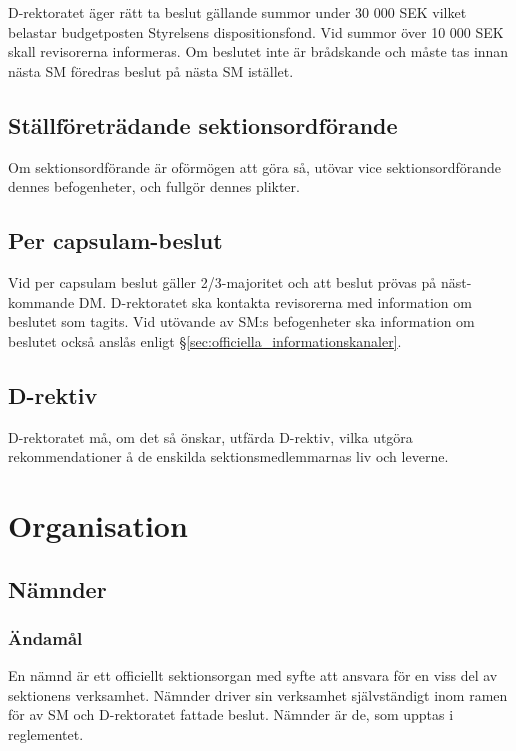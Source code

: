 \documentclass{dgovdoc}
\begin{document}
D-rektoratet äger rätt ta beslut gällande summor under 30 000 SEK vilket belastar budgetposten Styrelsens dispositionsfond. Vid summor över 10 000 SEK skall revisorerna informeras. Om beslutet inte är brådskande och måste tas innan nästa SM föredras beslut på nästa SM istället.

\subsection{Ställföreträdande sektionsordförande}

Om sektionsordförande är oförmögen att göra så, utövar vice sektionsordförande
dennes befogenheter, och fullgör dennes plikter.

\subsection{Per capsulam-beslut}

Vid per capsulam beslut gäller 2/3-majoritet och att beslut prövas på näst-
kommande DM. D-rektoratet ska kontakta revisorerna med information om
beslutet som tagits. Vid utövande av SM:s befogenheter ska information om
beslutet också anslås enligt \S\ref{sec:officiella_informationskanaler}.

\subsection{D-rektiv}

D-rektoratet må, om det så önskar, utfärda D-rektiv, vilka utgöra
rekommendationer å de enskilda sektionsmedlemmarnas liv och leverne.

\section{Organisation}

\subsection{Nämnder}
\label{sec:namnder}

\subsubsection{Ändamål}

En nämnd är ett officiellt sektionsorgan med syfte att ansvara för en viss del
av sektionens verksamhet. Nämnder driver sin verksamhet självständigt inom
ramen för av SM och D-rektoratet fattade beslut. Nämnder är de, som upptas i
reglementet.
\end{document}
